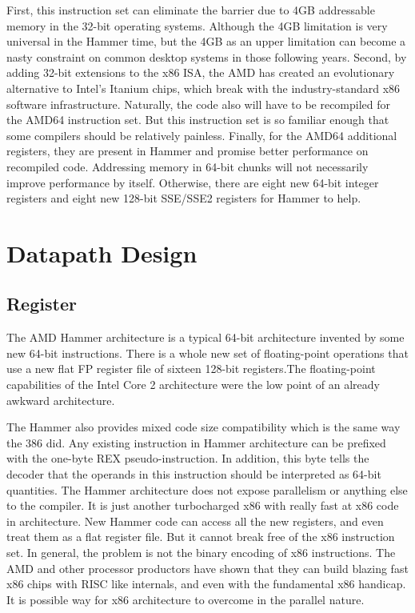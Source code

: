 \documentclass[letterpaper,10pt,compsoc,draftclsnofoot,onecolumn]{IEEEtran}
\begin{document}
First, this instruction set can eliminate the barrier due to 4GB addressable memory in the 32-bit operating systems. Although the 4GB limitation is very universal in the Hammer time, but the 4GB as an upper limitation can become a nasty constraint on common desktop systems in those following years. Second, by adding 32-bit extensions to the x86 ISA, the AMD has created an evolutionary alternative to Intel's Itanium chips, which break with the industry-standard x86 software infrastructure\cite{amd_athlon_64}. Naturally, the code also will have to be recompiled for the AMD64 instruction set. But this instruction set is so familiar enough that some compilers should be relatively painless. Finally, for the AMD64 additional registers, they are present in Hammer and promise better performance on recompiled code. Addressing memory in 64-bit chunks will not necessarily improve performance by itself. Otherwise, there are eight new 64-bit integer registers and eight new 128-bit SSE/SSE2 registers for Hammer to help.

\section{Datapath Design}
\subsection{Register}
The AMD Hammer architecture is a typical 64-bit architecture invented by some new 64-bit instructions. There is a whole new set of floating-point operations that use a new flat FP register file of sixteen 128-bit registers\cite{hammer_amd_arch}.The floating-point capabilities of the Intel Core 2 architecture were the low point of an already awkward architecture.

The Hammer also provides mixed code size compatibility which is the same way the 386 did. Any existing instruction in Hammer architecture can be prefixed with the one-byte REX pseudo-instruction\cite{amd_athlon_64}. In addition, this byte tells the decoder that the operands in this instruction should be interpreted as 64-bit quantities. The Hammer architecture does not expose parallelism or anything else to the compiler. It is just another turbocharged x86 with really fast at x86 code in architecture. New Hammer code can access all the new registers, and even treat them as a flat register file. But it cannot break free of the x86 instruction set. In general, the problem is not the binary encoding of x86 instructions. The AMD and other processor productors have shown that they can build blazing fast x86 chips with RISC like internals, and even with the fundamental x86 handicap. It is possible way for x86 architecture to overcome in the parallel nature.
\end{document}
